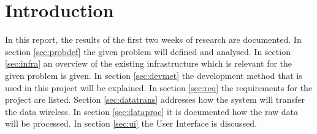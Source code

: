 \section{Introduction}
In this report, the results of the first two weeks of research are documented. In section \ref{sec:probdef} the given problem will defined and analysed. In section \ref{sec:infra} an overview of the existing infrastructure which is relevant for the given problem is given. In section \ref{sec:devmet} the development method that is used in this project will be explained. In section \ref{sec:req} the requirements for the project are listed. Section \ref{sec:datatrans} addresses how the system will transfer the data wireless. In section \ref{sec:dataproc} it is documented how the raw data will be processed. In section \ref{sec:ui} the User Interface is discussed.